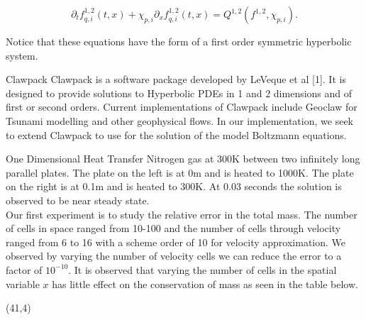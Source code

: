 \documentclass[unknownkeysallowed,final]{beamer}
\begin{document}
\begin{frame}{}
\begin{textblock}{18}
\begin{block}{\small{}}
\begin{equation*}
\label{eqint}
\partial_{t} f_{q,i}^{1,2}(t,x) + \chi_{p,i} \partial_{x} f_{q,i}^{1,2}(t,x) = Q^{1,2}(f^{1,2},\chi_{p,i}).
\end{equation*}

Notice that these equations have the form of a first order symmetric hyperbolic system.

\end{block}

\begin{block}{\small{Clawpack}}
Clawpack is a software package developed by LeVeque et al [1]. It is designed to provide solutions to Hyperbolic PDEs in 1 and 2 dimensions and of first or second orders. Current implementations of Clawpack include Geoclaw for Tsunami modelling and other geophysical flows. In our implementation, we seek to extend Clawpack to use for the solution of the model Boltzmann equations.
\end{block}

\begin{block}{\small{One Dimensional Heat Transfer}}
Nitrogen gas at 300K between two infinitely long parallel plates. The plate on the left is at 0m and is heated to 1000K. The plate on the right is at 0.1m and is heated to 300K. At 0.03 seconds the solution is observed to be near steady state.\\[2mm]
Our first experiment is to study the relative error in the total mass. The number of cells in space ranged from 10-100 and the number of cells through velocity ranged from 6 to 16 with a scheme order of 10 for velocity approximation.
We observed by varying the number of velocity cells we can reduce the error to a factor of $10^{-10}$. It is observed that varying the number of cells in the spatial variable $x$ has little effect on the conservation of mass as seen in the table below.

\end{block}
	\end{textblock}

	\begin{textblock}{17.3}(41,4)

\begin{block}{\small{}}

\begin{center}
	\begin{tabular}{ cc || c | c | c | c | c | c | c | c | c | r |}


\end{tabular}
\end{center}
\end{block}
\end{textblock}
\end{frame}
\end{document}
